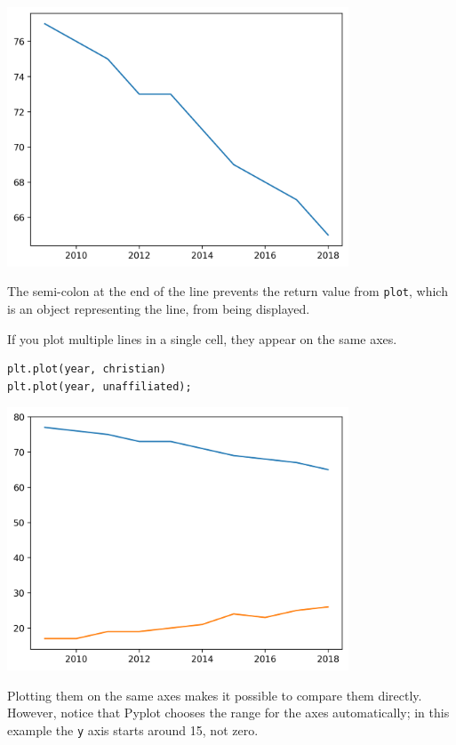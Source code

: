\begin{center}
\includegraphics[width=4in]{chapters/06_plotting_files/06_plotting_22_0.png}
\end{center}

The semi-colon at the end of the line prevents the return value from
\passthrough{\lstinline!plot!}, which is an object representing the
line, from being displayed.

If you plot multiple lines in a single cell, they appear on the same
axes.

\begin{lstlisting}[]
plt.plot(year, christian)
plt.plot(year, unaffiliated);
\end{lstlisting}

\begin{center}
\includegraphics[width=4in]{chapters/06_plotting_files/06_plotting_24_0.png}
\end{center}

Plotting them on the same axes makes it possible to compare them
directly. However, notice that Pyplot chooses the range for the axes
automatically; in this example the \passthrough{\lstinline!y!} axis
starts around 15, not zero.


